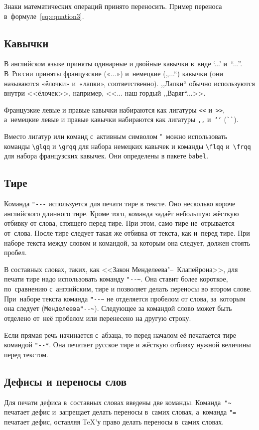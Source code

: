 Знаки математических операций принято переносить. Пример переноса
в~формуле~\eqref{eq:equation3}.

\subsection{Кавычки}
В английском языке приняты одинарные и двойные кавычки в~виде ‘...’ и~“...”.
В~России приняты французские («...») и~немецкие („...“) кавычки (они называются
«ёлочки» и~«лапки», соответственно). ,,Лапки`` обычно используются внутри
<<ёлочек>>, например, <<... наш гордый ,,Варяг``...>>.

Французкие левые и правые кавычки набираются
как лигатуры \verb|<<| и~\verb|>>|, а~немецкие левые
и правые кавычки набираются как лигатуры \verb|,,| и~\verb|‘‘| (\verb|``|).

Вместо лигатур или команд с~активным символом "\ можно использовать команды
\verb|\glqq| и \verb|\grqq| для набора немецких кавычек и команды \verb|\flqq|
и~\verb|\frqq| для набора французских кавычек. Они определены в пакете
\verb|babel|.

\subsection{Тире}
Команда \verb|"---| используется для печати тире в тексте. Оно несколько короче
английского длинного тире. Кроме того, команда задаёт небольшую жёсткую отбивку
от слова, стоящего перед тире. При этом, само тире не~отрывается от~слова.
После тире следует такая же отбивка от текста, как и~перед тире. При наборе
текста между словом и командой, за которым она следует, должен стоять пробел.

В составных словах, таких, как <<Закон Менделеева"--~Клапейрона>>, для печати
тире надо использовать команду \verb|"--~|. Она ставит более короткое,
по~сравнению с~английским, тире и позволяет делать переносы во втором слове.
При~наборе текста команда \verb|"--~| не отделяется пробелом от слова,
за~которым она следует (\verb|Менделеева"--~|). Следующее за командой слово
может быть  отделено от~неё пробелом или перенесено на другую строку.

Если прямая речь начинается с~абзаца, то перед началом её печатается тире
командой \verb|"--*|. Она печатает русское тире и жёсткую отбивку нужной
величины перед текстом.

\subsection{Дефисы и переносы слов}
Для печати дефиса в~составных словах введены две команды. Команда~\verb|"~|
печатает дефис и~запрещает делать переносы в~самих словах, а~команда \verb|"=|
печатает дефис, оставляя \TeX ’у право делать переносы в~самих словах.

